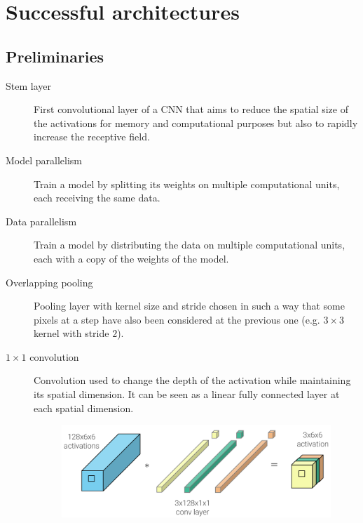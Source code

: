 \chapter{Successful architectures}


\section{Preliminaries}

\begin{description}
    \item[Stem layer] 
        First convolutional layer of a CNN that aims to reduce the spatial size of the activations for memory and computational purposes
        but also to rapidly increase the receptive field.

    \item[Model parallelism] 
        Train a model by splitting its weights on multiple computational units, each receiving the same data.

    \item[Data parallelism] 
        Train a model by distributing the data on multiple computational units, each with a copy of the weights of the model.

    \item[Overlapping pooling] 
        Pooling layer with kernel size and stride chosen in such a way that
        some pixels at a step have also been considered at the previous one (e.g. $3 \times 3$ kernel with stride $2$).

    \item[$1 \times 1$ convolution] 
        Convolution used to change the depth of the activation while maintaining its spatial dimension.
        It can be seen as a linear fully connected layer at each spatial dimension.

        \begin{figure}[H]
            \centering
            \includegraphics[width=0.55\linewidth]{./img/_1conv.pdf}
        \end{figure}


\end{description}
